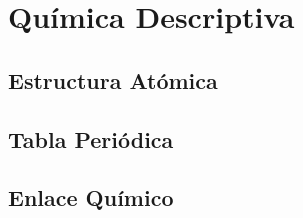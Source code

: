 \documentclass[
    11pt, %
    a4paper, %
]{LegrandOrangeBookES}
\begin{document}
    \newpage

    



    \part{Química Descriptiva}


    \chapterspaceabove{6.75cm} %
    \chapterspacebelow{7.25cm} %



    \chapter{Estructura Atómica}

    

    \newpage

    


    \chapter{Tabla Periódica}

    

    \newpage

    


    \chapter{Enlace Químico}

    
%
    \newpage
\end{document}
